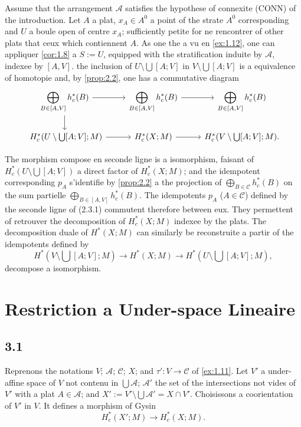 \documentclass[11pt,a4paper]{article}
\theoremstyle{plain}
\theoremstyle{definition}
\begin{document}
Assume that the arrangement $\mathcal{A}$ satisfies the hypothese of connexite (CONN) of the introduction. Let $A$ a plat, $x_A \in A^0$ a point of the strate $A^0$ corresponding and $U$ a boule open of centre $x_A$; sufficiently petite for ne rencontrer of other plats that ceux which contiennent $A$. As one the a vu en \ref{ex:1.12}, one can appliquer \ref{cor:1.8} a $S := U$, equipped with the stratification induite by $\mathcal{A}$, indexee by $[A,V]$. the inclusion of $U \setminus \bigcup[A;V]$ in $V \setminus \bigcup[A;V]$ is a equivalence of homotopie and, by \ref{prop:2.2}, one has a commutative diagram
\begin{equation}\label{eq:2.3.1}
\begin{tikzcd}
\displaystyle\bigoplus_{B \in [A,V]} h^*_c(B) \arrow[r] \arrow[d] & \displaystyle\bigoplus_{B \in [A,V]} h^*_c(B) \arrow[r] & \displaystyle\bigoplus_{B \in [A,V]} h^*_c(B) \\\
H^*_c(U \setminus \bigcup[A;V];M) \arrow[r] & H^*_c(X;M) \arrow[r] & H^*_c(V \setminus \bigcup[A;V];M).
\end{tikzcd}
\end{equation}

The morphism compose en seconde ligne is a isomorphism, faisant of $H^*_c(U \setminus \bigcup[A;V])$ a direct factor of $H^*_c(X;M)$; and the idempotent corresponding $p_A$ s'identifie by \ref{prop:2.2} a the projection of $\bigoplus_{B \in \mathcal{C}} h^*_c(B)$ on the sum partielle $\bigoplus_{B \in [A,V]} h^*_c(B)$. The idempotents $p_A$ ($A \in \mathcal{C}$) defined by the seconde ligne of (2.3.1) commutent therefore between eux. They permettent of retrouver the decomposition of $H^*_c(X;M)$ indexee by the plats. The decomposition duale of $H^*(X;M)$ can similarly be reconstruite a partir of the idempotents defined by
\[H^*(V \setminus \bigcup[A;V];M) \longrightarrow H^*(X;M) \longrightarrow H^*(U \setminus \bigcup[A;V];M),\]
decompose a isomorphism.


\section{Restriction a Under-space Lineaire}\label{sec:3}

\subsection{3.1}\label{subsec:3.1}

Reprenons the notations $V$; $\mathcal{A}$; $\mathcal{C}$; $X$; and $\tau': V \to \mathcal{C}$ of \ref{ex:1.11}. Let $V'$ a under-affine space of $V$ not contenu in $\bigcup\mathcal{A}$; $\mathcal{A}'$ the set of the intersections not vides of $V'$ with a plat $A \in \mathcal{A}$; and $X' := V' \setminus \bigcup\mathcal{A}' = X \cap V'$. Choisissons a coorientation of $V'$ in $V$. It defines a morphism of Gysin
\begin{equation}\label{eq:3.1.1}
H^*_c(X';M) \longrightarrow H^*_c(X;M).
\tag{3.1.1}
\end{equation}
\end{document}
